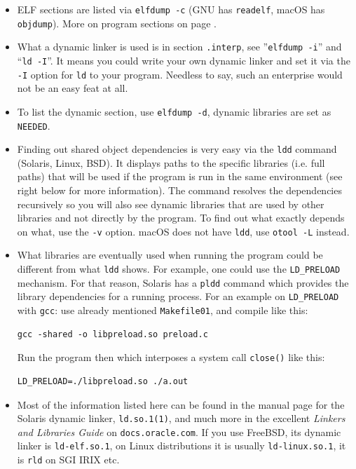 \begin{itemize}
\begin{itemize}
\item ELF sections are listed via \texttt{elfdump -c} (GNU has \texttt{readelf},
macOS has \texttt{objdump}).  More on program sections on page \pageref{ELF}.
\item What a dynamic linker is used is in section \texttt{.interp}, see
''\texttt{elf\-dump -i}'' and ``\texttt{ld -I}''.  It means you could write your
own dynamic linker and set it via the \texttt{-I} option for \texttt{ld} to your
program.  Needless to say, such an enterprise would not be an easy feat at
all.
\item To list the dynamic section, use \texttt{elfdump -d}, dynamic libraries
are set as \texttt{NEEDED}.
\item Finding out shared object dependencies is very easy via the
\texttt{ldd} command (Solaris, Linux, BSD).  It displays paths to the specific
libraries (i.e. full paths) that will be used if the program is run in the
same environment (see right below for more information).  The command resolves
the dependencies recursively so you will also see dynamic libraries that are used
by other libraries and not directly by the program.  To find out what exactly
depends on what, use the \texttt{-v} option.  macOS does not have \texttt{ldd},
use \texttt{otool -L} instead.
\item What libraries are eventually used when running the program could be
different from what \texttt{ldd} shows.  For example,
one could use the \texttt{LD\_PRELOAD} mechanism.  For that reason,
Solaris has a \texttt{pldd} command which provides the library dependencies for
a running process.  For an example on \texttt{LD\_PRELOAD} with \texttt{gcc}:
use already mentioned \texttt{Ma\-ke\-file01}, and compile
 like this:
\begin{verbatim}
gcc -shared -o libpreload.so preload.c
\end{verbatim}
Run the program then which interposes a system
call \texttt{close()} like this:
\begin{verbatim}
LD_PRELOAD=./libpreload.so ./a.out
\end{verbatim}
\item Most of the information listed here can be found in the manual page for the
Solaris dynamic linker, \texttt{ld.so.1(1)}, and much more in the excellent
\emph{Linkers and Libraries Guide} on \texttt{docs.oracle.com}.  If you use
FreeBSD, its dynamic linker is \texttt{ld-elf.so.1}, on Linux distributions it
is usually \texttt{ld-linux.so.1}, it is \texttt{rld} on SGI IRIX etc.

\end{itemize}
\end{itemize}

